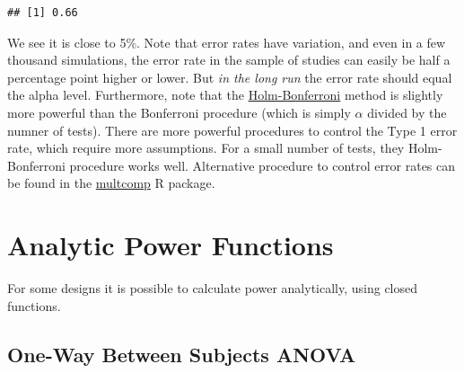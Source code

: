 \documentclass[]{book}
\begin{document}
\begin{verbatim}
## [1] 0.66
\end{verbatim}

We see it is close to 5\%. Note that error rates have variation, and even in a few thousand simulations, the error rate in the sample of studies can easily be half a percentage point higher or lower. But \emph{in the long run} the error rate should equal the alpha level. Furthermore, note that the \href{https://en.wikipedia.org/wiki/Holm\%E2\%80\%93Bonferroni_method}{Holm-Bonferroni} method is slightly more powerful than the Bonferroni procedure (which is simply \(\alpha\) divided by the numner of tests). There are more powerful procedures to control the Type 1 error rate, which require more assumptions. For a small number of tests, they Holm-Bonferroni procedure works well. Alternative procedure to control error rates can be found in the \href{https://cran.r-project.org/web/packages/multcomp/index.html}{multcomp} R package.

\hypertarget{analytic-power-functions}{%
\chapter{Analytic Power Functions}\label{analytic-power-functions}}

For some designs it is possible to calculate power analytically, using closed functions.

\hypertarget{one-way-between-subjects-anova}{%
\section{One-Way Between Subjects ANOVA}\label{one-way-between-subjects-anova}}
\end{document}
